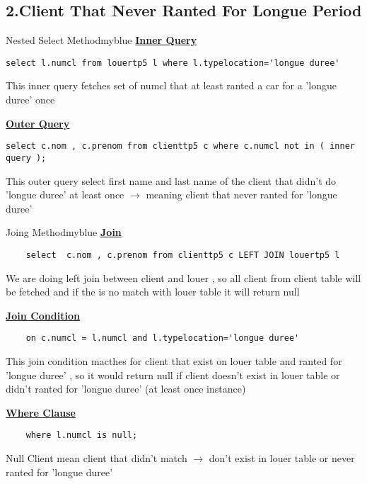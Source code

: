 \subsection*{2.Client That Never Ranted For Longue Period}



\begin{prettyBox}{Nested Select Method}{myblue}
    \textbf{\underline{Inner Query}}
   \begin{lstlisting}
select l.numcl from louertp5 l where l.typelocation='longue duree'
   \end{lstlisting}
This inner query fetches set of numcl that at least ranted a car for a 'longue duree' once

    \vspace{0.25cm}
    \textbf{\underline{Outer Query}}
    \begin{lstlisting}
select c.nom , c.prenom from clienttp5 c where c.numcl not in ( inner query );
    \end{lstlisting}
This outer query select first name and last name of the client that didn't do 'longue duree' at least once 
\(\rightarrow\) meaning client that never ranted for 'longue duree' 
\end{prettyBox}

\begin{prettyBox}{Joing Method}{myblue}
    \textbf{\underline{Join}}
    \begin{lstlisting}
    select  c.nom , c.prenom from clienttp5 c LEFT JOIN louertp5 l
    \end{lstlisting}
We are doing left join between client and louer , so all client from client table will be fetched
and if the is no match with louer table it will return null
   
    \vspace{0.25cm}
 
    \textbf{\underline{Join Condition}}
\begin{lstlisting}
    on c.numcl = l.numcl and l.typelocation='longue duree' 
\end{lstlisting}
This join condition macthes for client that exist on louer table and ranted for 'longue duree' , so it would 
return null if client doesn't exist in louer table or didn't ranted for 'longue duree' (at least once instance)
    \vspace{0.25cm}


    \textbf{\underline{Where Clause}}
  \begin{lstlisting}
    where l.numcl is null;
  \end{lstlisting} 
Null Client mean client that didn't match \(\rightarrow\) don't exist in louer table or never ranted for 'longue duree'
\end{prettyBox}

\vspace{0.5cm}
